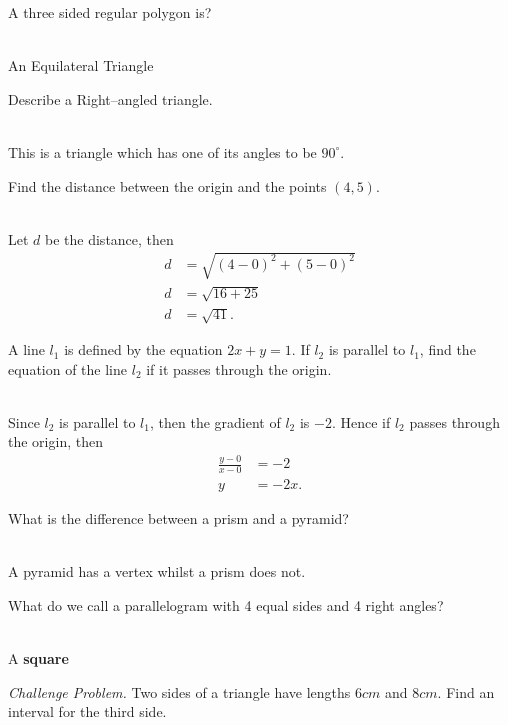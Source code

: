 \documentclass[addpoints,12pt]{exam}
\begin{document}
\begin{questions}
 \question A three sided regular polygon is?
	\ifprintanswers
	  \begin{solution}\\
		An Equilateral Triangle
	  \end{solution}
	\else
	  \makeemptybox{1.33in}
	\fi
 
 \question Describe a Right--angled triangle.
	\ifprintanswers
	  \begin{solution}\\
		This is a triangle which has one of its angles to be $90^\circ$.
	  \end{solution}
	\else
	  \makeemptybox{1.33in}
	\fi

 \question Find the distance between the origin and the points $(4,5)$.
	\ifprintanswers
	  \begin{solution}\\
		Let $d$ be the distance, then 
		\begin{align}
		  d &= \sqrt{(4-0)^2 + (5-0)^2} \\
		  d &= \sqrt{16 + 25} \\
		  d &= \sqrt{41}.
		\end{align}

	  \end{solution}
	\else
	  \makeemptybox{1.33in}
	\fi
	
 \question A line $l_1$ is defined by the equation $2x+y=1$. If $l_2$ is parallel to $l_1$, find 
the equation of the line $l_2$ if it passes through the origin.
	\ifprintanswers
	  \begin{solution}\\
		Since $l_2$ is parallel to $l_1$, then the gradient of $l_2$ is $-2$. Hence if $l_2$ passes 
through the origin, then 
		\begin{align}
		  \frac{y-0}{x-0} &= -2 \\
		  y &= -2x.
		\end{align}

	  \end{solution}
	\else
	  \makeemptybox{1.33in}
	\fi
	
 \question What is the difference between a prism and a pyramid?
	\ifprintanswers
	  \begin{solution}\\
		A pyramid has a vertex whilst a prism does not.
	  \end{solution}
	\else
	  \makeemptybox{1.33in}
	\fi
	
 \question What do we call a parallelogram with 4 equal sides and 4 right angles?
	\ifprintanswers
	  \begin{solution}\\
		A \textbf{square}
	  \end{solution}
	\else
	  \makeemptybox{1.33in}
	\fi


 \question \emph{Challenge Problem.} Two sides of a triangle have lengths $6cm$ and $8cm$. Find 
an interval for the third side.
\end{questions}
\vspace*{1cm}
\end{document}
